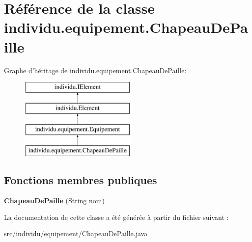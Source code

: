 \hypertarget{classindividu_1_1equipement_1_1_chapeau_de_paille}{\section{Référence de la classe individu.\-equipement.\-Chapeau\-De\-Paille}
\label{classindividu_1_1equipement_1_1_chapeau_de_paille}
}
Graphe d'héritage de individu.\-equipement.\-Chapeau\-De\-Paille\-:\begin{figure}[H]
\begin{center}
\leavevmode
\includegraphics[height=4.000000cm]{classindividu_1_1equipement_1_1_chapeau_de_paille}
\end{center}
\end{figure}
\subsection*{Fonctions membres publiques}
\begin{DoxyCompactItemize}
\item 
\hypertarget{classindividu_1_1equipement_1_1_chapeau_de_paille_a51ef580b58d76d1642ef982fe78b90ab}{{\bfseries Chapeau\-De\-Paille} (String nom)}\label{classindividu_1_1equipement_1_1_chapeau_de_paille_a51ef580b58d76d1642ef982fe78b90ab}

\end{DoxyCompactItemize}


La documentation de cette classe a été générée à partir du fichier suivant \-:\begin{DoxyCompactItemize}
\item 
src/individu/equipement/Chapeau\-De\-Paille.\-java\end{DoxyCompactItemize}
